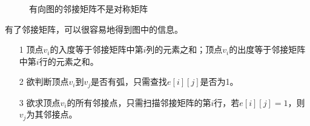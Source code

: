 \documentclass[10pt]{article}
\begin{document}
\begin{figure}[htbp]
\centering

\caption{有向图的邻接矩阵不是对称矩阵}
\end{figure}

有了邻接矩阵，可以很容易地得到图中的信息。
\begin{itemize}
\item[1] 顶点$v_i$的入度等于邻接矩阵中第$i$列的元素之和；顶点$v_i$的出度等于邻接矩阵中第$i$行的元素之和。
\item[2] 欲判断顶点$v_i$到$v_j$是否有弧，只需查找$e[i][j]$是否为1。
\item[3] 欲求顶点$v_i$的所有邻接点，只需扫描邻接矩阵的第$i$行，若$e[i][j]=1$，则$v_j$为其邻接点。
\end{itemize}
\end{document}
